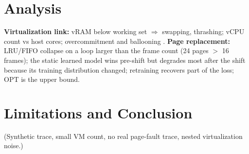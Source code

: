 \documentclass[10pt,a4paper]{article}
\begin{document}
\section{Analysis}
\textbf{Virtualization link:} vRAM below working set $\Rightarrow$ swapping, thrashing; vCPU count vs host cores; overcommitment and ballooning \cite{waldspurger}. \textbf{Page replacement:} LRU/FIFO collapse on a loop larger than the frame count (24 pages $>$ 16 frames); the static learned model wins pre-shift but degrades most after the shift because its training distribution changed; retraining recovers part of the loss; OPT is the upper bound.
\section{Limitations and Conclusion}
(Synthetic trace, small VM count, no real page-fault trace, nested virtualization noise.)

\end{document}
